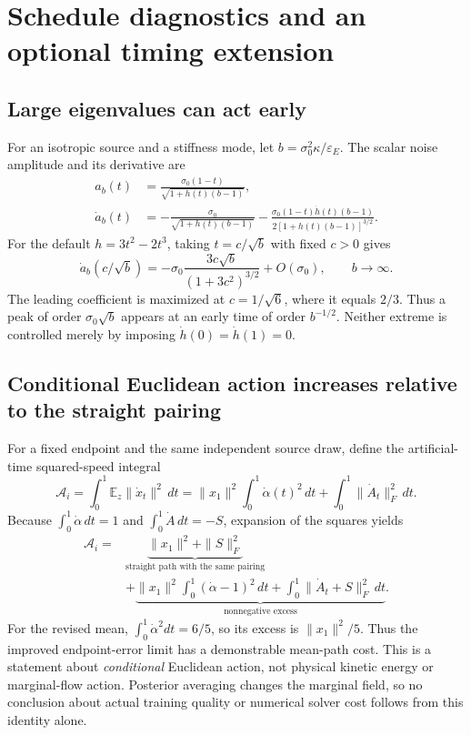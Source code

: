 \documentclass[11pt,letterpaper]{article}
\newcommand{\E}{\mathbb E}
\newcommand{\epsE}{\varepsilon_E}
\begin{document}
\section{Schedule diagnostics and an optional timing extension}\label{app:schedule}

\subsection{Large eigenvalues can act early}
For an isotropic source and a stiffness mode, let
$b=\sigma_0^2\kappa/\epsE$. The scalar noise amplitude and its derivative are
\begin{equation}\label{eq:scalar}
\begin{aligned}
a_b(t)&=\frac{\sigma_0(1-t)}{\sqrt{1+h(t)(b-1)}},\\
\dot a_b(t)&=-\frac{\sigma_0}{\sqrt{1+h(t)(b-1)}}
-\frac{\sigma_0(1-t)\dot h(t)(b-1)}{2[1+h(t)(b-1)]^{3/2}}.
\end{aligned}
\end{equation}
For the default $h=3t^2-2t^3$, taking $t=c/\sqrt b$ with fixed $c>0$ gives
\begin{equation}\label{eq:largemode}
\dot a_b(c/\sqrt b)
=-\sigma_0\frac{3c\sqrt b}{(1+3c^2)^{3/2}}+O(\sigma_0),\qquad b\to\infty.
\end{equation}
The leading coefficient is maximized at $c=1/\sqrt6$, where it equals $2/3$. Thus a peak of order $\sigma_0\sqrt b$ appears at an early time of order $b^{-1/2}$. Neither extreme is controlled merely by imposing $\dot h(0)=\dot h(1)=0$.

\subsection{Conditional Euclidean action increases relative to the straight pairing}
For a fixed endpoint and the same independent source draw, define the artificial-time squared-speed integral
\begin{equation}\label{eq:action}
\mathcal A_i=\int_0^1\E_z\|\dot x_t\|^2\,dt
=\|x_1\|^2\int_0^1\dot\alpha(t)^2\,dt
+\int_0^1\|\dot A_t\|_F^2\,dt.
\end{equation}
Because $\int_0^1\dot\alpha\,dt=1$ and $\int_0^1\dot A\,dt=-S$, expansion of the squares yields
\begin{equation}\label{eq:actionidentity}
\boxed{\begin{aligned}
\mathcal A_i
={}&\underbrace{\|x_1\|^2+\|S\|_F^2}_{\text{straight path with the same pairing}}\\
&+\underbrace{\|x_1\|^2\int_0^1(\dot\alpha-1)^2\,dt
+\int_0^1\|\dot A_t+S\|_F^2\,dt}_{\text{nonnegative excess}}.
\end{aligned}}
\end{equation}
For the revised mean, $\int_0^1\dot\alpha^2dt=6/5$, so its excess is $\|x_1\|^2/5$. Thus the improved endpoint-error limit has a demonstrable mean-path cost. This is a statement about \emph{conditional} Euclidean action, not physical kinetic energy or marginal-flow action. Posterior averaging changes the marginal field, so no conclusion about actual training quality or numerical solver cost follows from this identity alone.
\end{document}

